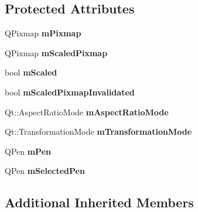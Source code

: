 \subsection*{Protected Attributes}
\begin{DoxyCompactItemize}
\item 
Q\+Pixmap {\bfseries m\+Pixmap}\hypertarget{class_q_c_p_item_pixmap_a1396cce7f26c7b8e9512906284380c4d}{}\label{class_q_c_p_item_pixmap_a1396cce7f26c7b8e9512906284380c4d}

\item 
Q\+Pixmap {\bfseries m\+Scaled\+Pixmap}\hypertarget{class_q_c_p_item_pixmap_a2ebc66e15b9f1264563d58f29ba1bc00}{}\label{class_q_c_p_item_pixmap_a2ebc66e15b9f1264563d58f29ba1bc00}

\item 
bool {\bfseries m\+Scaled}\hypertarget{class_q_c_p_item_pixmap_a8fe670a529cd46a9b8afd9fc1203bc3f}{}\label{class_q_c_p_item_pixmap_a8fe670a529cd46a9b8afd9fc1203bc3f}

\item 
bool {\bfseries m\+Scaled\+Pixmap\+Invalidated}\hypertarget{class_q_c_p_item_pixmap_a223134abd4cf3d6c368573c622bd2e1c}{}\label{class_q_c_p_item_pixmap_a223134abd4cf3d6c368573c622bd2e1c}

\item 
Qt\+::\+Aspect\+Ratio\+Mode {\bfseries m\+Aspect\+Ratio\+Mode}\hypertarget{class_q_c_p_item_pixmap_a8dc6b6c1e106ac523efae22d5fe55bab}{}\label{class_q_c_p_item_pixmap_a8dc6b6c1e106ac523efae22d5fe55bab}

\item 
Qt\+::\+Transformation\+Mode {\bfseries m\+Transformation\+Mode}\hypertarget{class_q_c_p_item_pixmap_ac9ecad3b9842363754e32eda2cf821bd}{}\label{class_q_c_p_item_pixmap_ac9ecad3b9842363754e32eda2cf821bd}

\item 
Q\+Pen {\bfseries m\+Pen}\hypertarget{class_q_c_p_item_pixmap_acfee1124eb51a1887aaf8de10777c7a1}{}\label{class_q_c_p_item_pixmap_acfee1124eb51a1887aaf8de10777c7a1}

\item 
Q\+Pen {\bfseries m\+Selected\+Pen}\hypertarget{class_q_c_p_item_pixmap_a0949e5bb6a261fc4e9668e28e2effcfa}{}\label{class_q_c_p_item_pixmap_a0949e5bb6a261fc4e9668e28e2effcfa}

\end{DoxyCompactItemize}
\subsection*{Additional Inherited Members}



